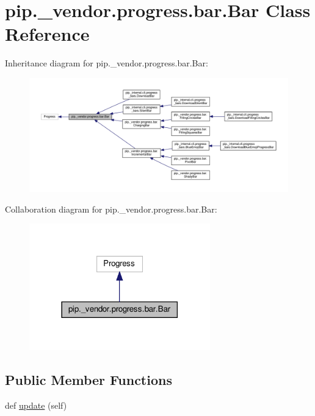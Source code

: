 \hypertarget{classpip_1_1__vendor_1_1progress_1_1bar_1_1Bar}{}\section{pip.\+\_\+vendor.\+progress.\+bar.\+Bar Class Reference}
\label{classpip_1_1__vendor_1_1progress_1_1bar_1_1Bar}


Inheritance diagram for pip.\+\_\+vendor.\+progress.\+bar.\+Bar\+:
\nopagebreak
\begin{figure}[H]
\begin{center}
\leavevmode
\includegraphics[width=350pt]{classpip_1_1__vendor_1_1progress_1_1bar_1_1Bar__inherit__graph}
\end{center}
\end{figure}


Collaboration diagram for pip.\+\_\+vendor.\+progress.\+bar.\+Bar\+:
\nopagebreak
\begin{figure}[H]
\begin{center}
\leavevmode
\includegraphics[width=222pt]{classpip_1_1__vendor_1_1progress_1_1bar_1_1Bar__coll__graph}
\end{center}
\end{figure}
\subsection*{Public Member Functions}
\begin{DoxyCompactItemize}
\item 
def \hyperlink{classpip_1_1__vendor_1_1progress_1_1bar_1_1Bar_a8ce0fc733c1eb071d5e46991bd8d6dbf}{update} (self)
\end{DoxyCompactItemize}
